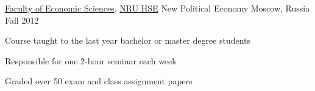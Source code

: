 \begin{cventries}
  \cventry
    {\href{https://economics.hse.ru/en/}{Faculty of Economic Sciences}, \href{http://www.hse.ru/en/}{NRU HSE}} %
    {New Political Economy} %
    {Moscow, Russia} %
    {Fall 2012} %
    {
      \begin{cvitems} %
        \item {Course taught to the last year bachelor or master degree students}
        \item {Responsible for one 2-hour seminar each week}
        \item {Graded over 50 exam and class assignment papers}
      \end{cvitems}
    }

\end{cventries}

